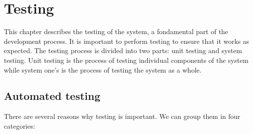 \chapter{Testing}

This chapter describes the testing of the system, a fondamental part of the development process. It is important to perform testing to ensure that it works as expected. The testing process is divided into two parts: unit testing and system testing. Unit testing is the process of testing individual components of the system while system one's is the process of testing the system as a whole.

\section{Automated testing}


There are several reasons why testing is important. We can group them in four categories:

